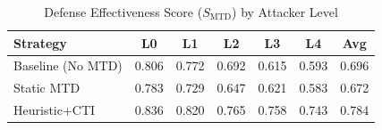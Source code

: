 \begin{table}[!t]
\centering
\caption{Defense Effectiveness Score ($S_{\mathrm{MTD}}$) by Attacker Level}
\label{tab:level_performance}
\renewcommand{\arraystretch}{1.1}
\begin{tabular}{@{}lcccccc@{}}
\toprule
\textbf{Strategy} & \textbf{L0} & \textbf{L1} & \textbf{L2} & \textbf{L3} & \textbf{L4} & \textbf{Avg} \\
\midrule
Baseline (No MTD) & 0.806 & 0.772 & 0.692 & 0.615 & 0.593 & 0.696 \\
Static MTD & 0.783 & 0.729 & 0.647 & 0.621 & 0.583 & 0.672 \\
Heuristic+CTI & 0.836 & 0.820 & 0.765 & 0.758 & 0.743 & 0.784 \\
\bottomrule
\end{tabular}
\end{table}
